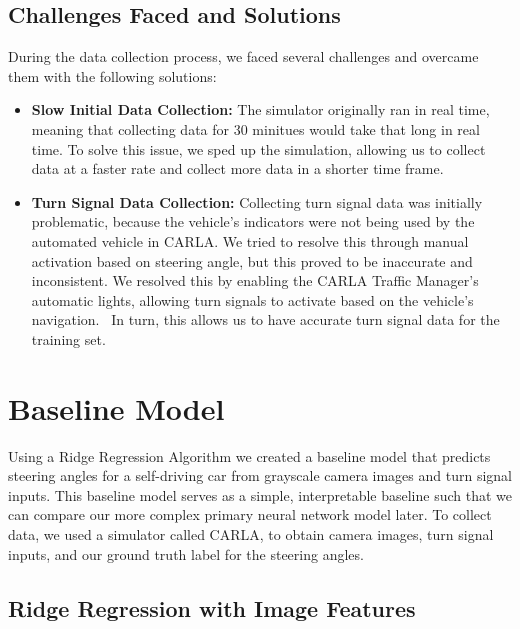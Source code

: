 \documentclass{article} %
\begin{document}
\subsection{Challenges Faced and Solutions}

During the data collection process, we faced several challenges and overcame them with the following solutions:

\begin{itemize}
  \item \textbf{Slow Initial Data Collection:} The simulator originally ran in real time, meaning that collecting data for 30 minitues would take that long in real time. 
  To solve this issue, we sped up the simulation, allowing us to collect data at a faster rate and collect more data in a shorter time frame.

  \item \textbf{Turn Signal Data Collection:} Collecting turn signal data was initially problematic, 
  because the vehicle's indicators were not being used by the automated vehicle in CARLA. 
  We tried to resolve this through manual activation based on steering angle, but this proved to be inaccurate and inconsistent. 
  We resolved this by enabling the CARLA Traffic Manager’s automatic lights, allowing turn signals to activate based on the vehicle's navigation. \
  In turn, this allows us to have accurate turn signal data for the training set. 

\end{itemize}
 
\section{Baseline Model}

Using a Ridge Regression Algorithm we created a baseline model that predicts steering angles for a self-driving car 
from grayscale camera images and turn signal inputs. This baseline model serves as a simple, interpretable baseline
such that we can compare our more complex primary neural network model later. To collect data, we used a simulator
called CARLA, to obtain camera images, turn signal inputs, and our ground truth label for the steering angles.


\subsection{Ridge Regression with Image Features}
\end{document}
